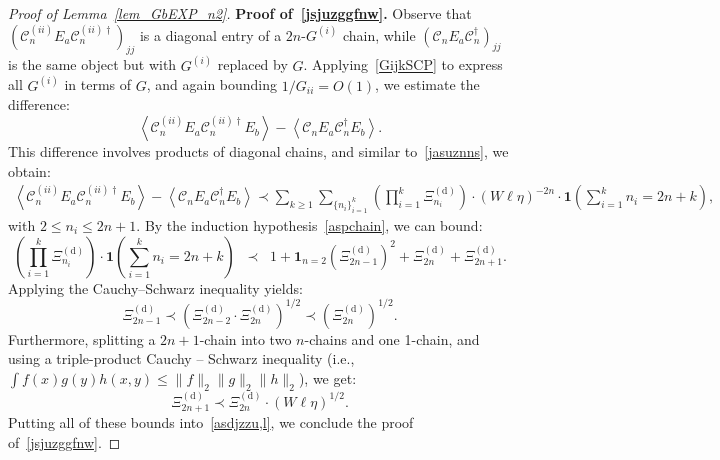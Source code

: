 \documentclass[10pt,reqno]{article}
\theoremstyle{plain} %
\theoremstyle{remark}
\numberwithin{equation}{section}
\begin{document}
\begin{proof}[Proof of Lemma~\ref{lem_GbEXP_n2}]
\bigskip
\noindent
\textbf{Proof of~\eqref{jsjuzggfnw}.} Observe that \( \left( \mathcal{C}^{(ii)}_n E_a \mathcal{C}^{(ii)\dagger}_n \right)_{jj} \) is a diagonal entry of a $2n$-$G^{(i)}$ chain, while \( \left( \mathcal{C}_n E_a \mathcal{C}^\dagger_n \right)_{jj} \) is the same object but with \( G^{(i)} \) replaced by \( G \). Applying~\eqref{GijkSCP} to express all \( G^{(i)} \) in terms of \( G \), and again bounding \( 1/G_{ii} = O(1) \), we estimate the difference:
\[
\left\langle \mathcal{C}^{(ii)}_n E_a \mathcal{C}^{(ii)\dagger}_n E_b \right\rangle - \left\langle \mathcal{C}_n E_a \mathcal{C}^\dagger_n E_b \right\rangle.
\]
This difference involves products of diagonal chains, and similar to~\eqref{jasuznns}, we obtain:
\begin{align}\label{asdjzzu,l}
\left\langle \mathcal{C}^{(ii)}_n E_a \mathcal{C}^{(ii)\dagger}_n E_b \right\rangle 
- \left\langle \mathcal{C}_n E_a \mathcal{C}^\dagger_n E_b \right\rangle 
\prec \sum_{k \ge 1} \sum_{\{n_i\}_{i=1}^k} 
\left( \prod_{i=1}^k \Xi^{(\mathrm{d})}_{n_i} \right) \cdot (W \ell \eta)^{-2n} \cdot \mathbf{1}\left( \sum_{i=1}^k n_i = 2n + k \right),
\end{align}
with \( 2 \le n_i \le 2n + 1 \).
By the induction hypothesis~\eqref{aspchain}, we can bound:
\[
\left( \prod_{i=1}^k \Xi^{(\mathrm{d})}_{n_i} \right) \cdot \mathbf{1}\left( \sum_{i=1}^k n_i = 2n + k \right)
\; \;\prec \;\;1 + \mathbf{1}_{n=2} \left( \Xi^{(\mathrm{d})}_{2n-1} \right)^2 + \Xi^{(\mathrm{d})}_{2n} + \Xi^{(\mathrm{d})}_{2n+1}.
\]
Applying the Cauchy–Schwarz inequality yields:
\[
\Xi^{(\mathrm{d})}_{2n - 1} \prec \left( \Xi^{(\mathrm{d})}_{2n - 2} \cdot \Xi^{(\mathrm{d})}_{2n} \right)^{1/2} \prec \left( \Xi^{(\mathrm{d})}_{2n} \right)^{1/2}.
\]
Furthermore, splitting a \( 2n + 1 \)-chain into two \( n \)-chains and one 1-chain, and using a triple-product Cauchy – Schwarz inequality (i.e., \( \int f(x) g(y) h(x,y) \le \|f\|_2 \|g\|_2 \|h\|_2 \)), we get:
\[
\Xi^{(\mathrm{d})}_{2n + 1} \prec \Xi^{(\mathrm{d})}_{2n} \cdot (W \ell \eta)^{1/2}.
\]
Putting all of these bounds into~\eqref{asdjzzu,l}, we conclude the proof of~\eqref{jsjuzggfnw}.



\end{proof}
\end{document}
